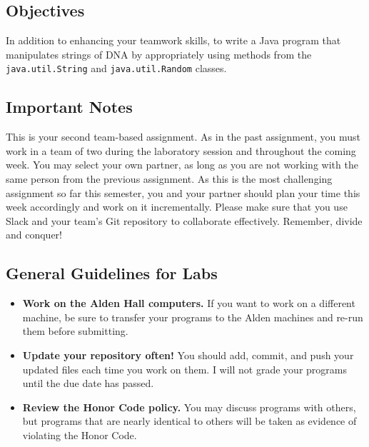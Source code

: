 


\subsection*{Objectives}
\vspace{-0.05in}

In addition to enhancing your teamwork skills, to write a Java program that manipulates strings of DNA by appropriately
using methods from the {\tt java.util.String} and {\tt java.util.Random} classes.

\vspace{-0.05in}
\subsection*{Important Notes}
\vspace{-0.05in}

This is your second team-based assignment. As in the past assignment, you must work in a team of two during the
laboratory session and throughout the coming week. You may select your own partner, as long as you are not working with
the same person from the previous assignment.  As this is the most challenging assignment so far this semester, you and
your partner should plan your time this week accordingly and work on it incrementally. Please make sure that you use
Slack and your team's Git repository to collaborate effectively. Remember, divide and conquer!

\vspace{-0.05in}
\subsection*{General Guidelines for Labs}
\vspace{-0.05in}
\begin{itemize}
\item
{\bf Work on the Alden Hall computers.} If you want to work on a different
machine, be sure to transfer your programs to the Alden
machines and re-run them before submitting.
\item
{\bf Update your repository often!} You should add, commit,
and push your updated files each time you work on them.  I will not grade
your programs until the due date has passed.
\item
{\bf Review the Honor Code policy.} You
may discuss programs with others, but programs that are nearly identical
to others will be taken as evidence of violating the Honor Code.
\end{itemize}

